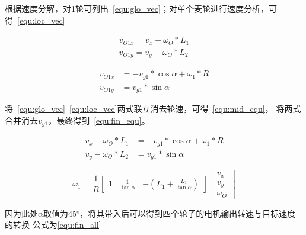 根据速度分解，对1轮可列出~\ref{equ:glo_vec}；对单个麦轮进行速度分析，可得~\ref{equ:loc_vec}

\begin{equation}
  \label{equ:glo_vec}
  \begin{aligned}
    v_{O1x} = v_x - \omega_O * L_1\\
    v_{O1y} = v_y - \omega_O * L_2
  \end{aligned}
\end{equation}

\begin{equation}
  \label{equ:loc_vec}
  \begin{aligned}
    v_{O1x} &= - v_{g1} * \cos\alpha + \omega_1 * R\\
    v_{O1y} &= v_{g1} * \sin\alpha
  \end{aligned}
\end{equation}

将~\ref{equ:glo_vec}~\ref{equ:loc_vec}两式联立消去轮速，可得~\ref{equ:mid_equ}，
将两式合并消去$v_{g1}$，最终得到~\ref{equ:fin_equ}。

\begin{equation}
  \label{equ:mid_equ}
  \begin{aligned}
    v_x - \omega_O * L_1 &= - v_{g1} * \cos\alpha + \omega_1 * R \\
    v_y - \omega_O * L_2 &= v_{g1} * \sin\alpha
  \end{aligned}
\end{equation}


\begin{equation}
  \label{equ:fin_equ}
  \omega_1 = \frac{1}{R}
    \begin{bmatrix}
      1 & \frac{1}{\tan\alpha} & -(L_1 + \frac{L_2}{\tan\alpha})
    \end{bmatrix}
    \begin{bmatrix}
      v_x \\
      v_y \\
      \omega_O
    \end{bmatrix}
\end{equation}

因为此处$\alpha$取值为\ang{45}，将其带入后可以得到四个轮子的电机输出转速与目标速度的转换
公式为\ref{equ:fin_all}

